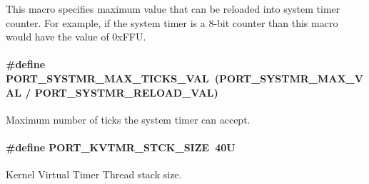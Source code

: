 This macro specifies maximum value that can be reloaded into system timer counter. For example, if the system timer is a 8-\/bit counter than this macro would have the value of 0x\-F\-F\-U. \hypertarget{group__template__cpu__intf_gad32a57bda2ce96037186e490b5a024e9}{
\paragraph[{P\-O\-R\-T\-\_\-\-S\-Y\-S\-T\-M\-R\-\_\-\-M\-A\-X\-\_\-\-T\-I\-C\-K\-S\-\_\-\-V\-A\-L}]{\setlength{\rightskip}{0pt plus 5cm}\#define P\-O\-R\-T\-\_\-\-S\-Y\-S\-T\-M\-R\-\_\-\-M\-A\-X\-\_\-\-T\-I\-C\-K\-S\-\_\-\-V\-A\-L~({\bf P\-O\-R\-T\-\_\-\-S\-Y\-S\-T\-M\-R\-\_\-\-M\-A\-X\-\_\-\-V\-A\-L} / P\-O\-R\-T\-\_\-\-S\-Y\-S\-T\-M\-R\-\_\-\-R\-E\-L\-O\-A\-D\-\_\-\-V\-A\-L)}}\label{group__template__cpu__intf_gad32a57bda2ce96037186e490b5a024e9}


Maximum number of ticks the system timer can accept. 

\hypertarget{group__template__cpu__intf_ga9f3862a2ded7b9fbb69f982acc020728}{
\paragraph[{P\-O\-R\-T\-\_\-\-K\-V\-T\-M\-R\-\_\-\-S\-T\-C\-K\-\_\-\-S\-I\-Z\-E}]{\setlength{\rightskip}{0pt plus 5cm}\#define P\-O\-R\-T\-\_\-\-K\-V\-T\-M\-R\-\_\-\-S\-T\-C\-K\-\_\-\-S\-I\-Z\-E~40\-U}}\label{group__template__cpu__intf_ga9f3862a2ded7b9fbb69f982acc020728}


Kernel Virtual Timer Thread stack size. 

